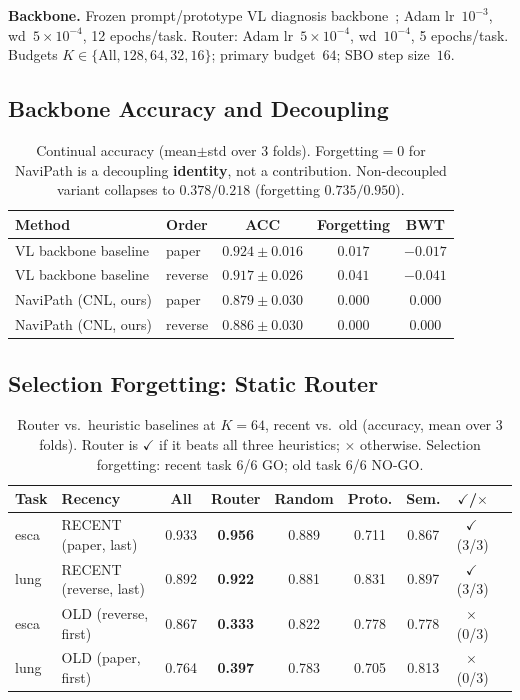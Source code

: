 \documentclass[runningheads]{llncs}
\newcommand{\go}{\ensuremath{\checkmark}}
\newcommand{\nogo}{\ensuremath{\times}}
\begin{document}
\noindent\textbf{Backbone.} Frozen prompt/prototype VL diagnosis
backbone~\cite{gou2025qpmil}; Adam lr~$10^{-3}$, wd~$5\!\times\!10^{-4}$,
12 epochs/task. Router: Adam lr~$5\!\times\!10^{-4}$, wd~$10^{-4}$,
5 epochs/task. Budgets $K\in\{\text{All},128,64,32,16\}$; primary
budget~$64$; SBO step size~$16$.

\subsection{Backbone Accuracy and Decoupling}
\begin{table}[htbp]
\centering
\caption{Continual accuracy (mean$\pm$std over 3 folds). Forgetting$=0$
for NaviPath is a decoupling \textbf{identity}, not a contribution.
Non-decoupled variant collapses to $0.378/0.218$ (forgetting $0.735/0.950$).}
\label{tab:acc}
\small\begin{tabular}{llccc}
\toprule
Method & Order & ACC & Forgetting & BWT \\
\midrule
VL backbone baseline & paper   & $0.924\pm0.016$ & $0.017$ & $-0.017$ \\
VL backbone baseline & reverse & $0.917\pm0.026$ & $0.041$ & $-0.041$ \\
NaviPath (CNL, ours) & paper   & $0.879\pm0.030$ & $\mathbf{0.000}$ & $0.000$ \\
NaviPath (CNL, ours) & reverse & $0.886\pm0.030$ & $\mathbf{0.000}$ & $0.000$ \\
\bottomrule
\end{tabular}
\end{table}

\subsection{Selection Forgetting: Static Router}
\begin{table}[htbp]
\centering
\caption{Router vs.\ heuristic baselines at $K{=}64$, recent vs.\ old
(accuracy, mean over 3 folds). Router is \go{} if it beats all three
heuristics; \nogo{} otherwise. Selection forgetting: recent task 6/6
GO; old task 6/6 NO-GO.}
\label{tab:router}
\small\begin{tabular}{llccccccc}
\toprule
Task & Recency & All & \textbf{Router} & Random & Proto. & Sem. & \go/\nogo \\
\midrule
esca & RECENT (paper, last)   & 0.933 & \textbf{0.956} & 0.889 & 0.711 & 0.867 & \go\,(3/3) \\
lung & RECENT (reverse, last) & 0.892 & \textbf{0.922} & 0.881 & 0.831 & 0.897 & \go\,(3/3) \\
esca & OLD (reverse, first)   & 0.867 & \textbf{0.333} & 0.822 & 0.778 & 0.778 & \nogo\,(0/3) \\
lung & OLD (paper, first)     & 0.764 & \textbf{0.397} & 0.783 & 0.705 & 0.813 & \nogo\,(0/3) \\
\bottomrule
\end{tabular}
\end{table}
\end{document}
